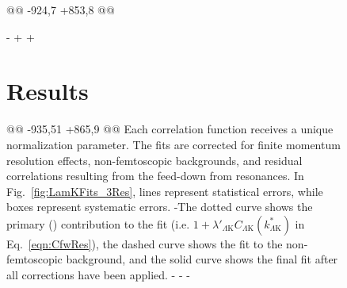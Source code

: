 \begin{figure}[h]
{ \begin{table}[htbp]
  \centering 
@@ -924,7 +853,8 @@
 
 
 
-
+%
+%
 \section{Results}
 \label{sec:Results}
@@ -935,51 +865,9 @@
 Each correlation function receives a unique normalization parameter.
 The fits are corrected for finite momentum resolution effects, non-femtoscopic backgrounds, and residual correlations resulting from the feed-down from resonances.
 In Fig.\ \ref{fig:LamKFits_3Res}, lines represent statistical errors, while boxes represent systematic errors.  
-The dotted curve shows the primary (\LamK) contribution to the fit (i.e. $1 + \lambda'_{\Lambda\mathrm{K}}C_{\Lambda\mathrm{K}}(k^{*}_{\Lambda\mathrm{K}})$ in Eq.\ \ref{eqn:CfwRes}), the dashed curve shows the fit to the non-femtoscopic background, and the solid curve shows the final fit after all corrections have been applied.
-
-%
-\begin{comment}
-\begin{figure}[h]
-  \centering
-  \texttt{[image: \\ResultsDirBaseLamKch\\SaveNameModLamKch/canKStarCfwFitsLamKchPwConj\_0010\_1030\_3050\_LabelLines\\SaveNameModLamKch.pdf]}
-  \caption[\LamKchPALamKchM data with fits]
-  {
-  (Color online) Fit results for the \LamKchP and \ALamKchM data.
-  The \LamKchP data is shown in the left column, the \ALamKchM in the right, and the rows differentiate the different centrality bins (0--10\% in the top, 10--30\% in the middle, and 30--50\% in the bottom).
-  See text for further details.
-  }
-  \label{fig:LamKchPwConjFits_3Res}
-\end{figure}
-
-
-
-\begin{figure}[h!]
-  \centering
-  \texttt{[image: \\ResultsDirBaseLamKch\\SaveNameModLamKch/canKStarCfwFitsLamKchMwConj\_0010\_1030\_3050\_LabelLines\\SaveNameModLamKch.pdf]}
-  \caption[\LamKchMALamKchP data with fits]
-  {
-  (Color online) Fit results for the \LamKchM and \ALamKchP data.
-  The \LamKchM data is shown in the left column, the \ALamKchP in the right, and the rows differentiate the different centrality bins (0--10\% in the top, 10--30\% in the middle, and 30--50\% in the bottom).

\end{comment}
\end{table}}
\end{figure}

